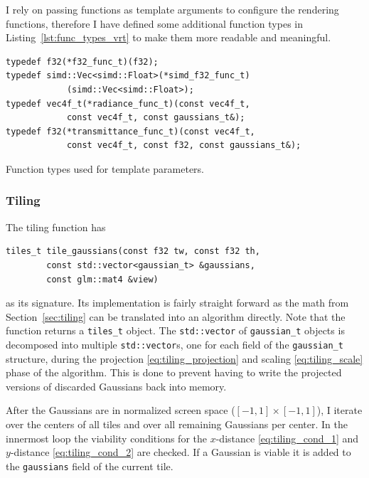 \documentclass[a4paper, 11pt]{memoir}
\begin{document}
    I rely on passing functions as template arguments to configure the rendering functions, therefore I have defined some
    additional function types in Listing~\ref{lst:func_types_vrt} to make them more readable and meaningful.

    \begin{listing}[t]
        \begin{verbatim}
typedef f32(*f32_func_t)(f32);
typedef simd::Vec<simd::Float>(*simd_f32_func_t)
            (simd::Vec<simd::Float>);
typedef vec4f_t(*radiance_func_t)(const vec4f_t,
            const vec4f_t, const gaussians_t&);
typedef f32(*transmittance_func_t)(const vec4f_t,
            const vec4f_t, const f32, const gaussians_t&);
        \end{verbatim}
        \caption{Function types used for template parameters.}
        \label{lst:func_types_vrt}
    \end{listing}

    \subsubsection{Tiling}
    The tiling function has
    \begin{verbatim}
tiles_t tile_gaussians(const f32 tw, const f32 th,
        const std::vector<gaussian_t> &gaussians,
        const glm::mat4 &view)
    \end{verbatim}
    as its signature. Its implementation is fairly straight forward as the math from Section~\ref{sec:tiling} can be
    translated into an algorithm directly. Note that the function returns a \texttt{tiles_t} object. The
    \texttt{std::vector} of \texttt{gaussian_t} objects is decomposed into
    multiple \texttt{std::vector}s, one for each field of the \texttt{gaussian_t} structure, during
    the projection \eqref{eq:tiling_projection} and scaling \eqref{eq:tiling_scale} phase of the algorithm. This is done
    to prevent having to write the projected versions of discarded Gaussians back into memory.

    After the Gaussians are in normalized screen space ($[-1, 1] \times [-1, 1]$), I iterate over the centers of all
    tiles and over all remaining Gaussians per center. In the innermost loop the viability conditions for the $x$-distance
    \eqref{eq:tiling_cond_1} and $y$-distance \eqref{eq:tiling_cond_2} are checked. If a Gaussian is viable it is
    added to the \texttt{gaussians} field of the current tile.
\end{document}
